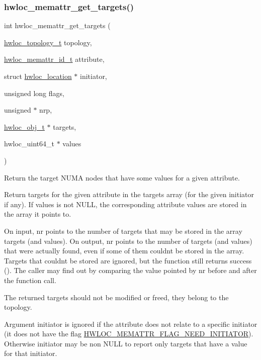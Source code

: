 \subsubsection{\texorpdfstring{hwloc\+\_\+memattr\+\_\+get\+\_\+targets()}{hwloc\_memattr\_get\_targets()}}
{\footnotesize\ttfamily int hwloc\+\_\+memattr\+\_\+get\+\_\+targets (\begin{DoxyParamCaption}\item[{\hyperlink{a00186_ga9d1e76ee15a7dee158b786c30b6a6e38}{hwloc\+\_\+topology\+\_\+t}}]{topology,  }\item[{\hyperlink{a00211_gacc82003a8610be554615995f0996c888}{hwloc\+\_\+memattr\+\_\+id\+\_\+t}}]{attribute,  }\item[{struct \hyperlink{a00314}{hwloc\+\_\+location} $\ast$}]{initiator,  }\item[{unsigned long}]{flags,  }\item[{unsigned $\ast$}]{nrp,  }\item[{\hyperlink{a00185_ga79b8ab56877ef99ac59b833203391c7d}{hwloc\+\_\+obj\+\_\+t} $\ast$}]{targets,  }\item[{hwloc\+\_\+uint64\+\_\+t $\ast$}]{values }\end{DoxyParamCaption})}



Return the target N\+U\+MA nodes that have some values for a given attribute. 

Return targets for the given attribute in the {\ttfamily targets} array (for the given initiator if any). If {\ttfamily values} is not {\ttfamily N\+U\+LL}, the corresponding attribute values are stored in the array it points to.

On input, {\ttfamily nr} points to the number of targets that may be stored in the array {\ttfamily targets} (and {\ttfamily values}). On output, {\ttfamily nr} points to the number of targets (and values) that were actually found, even if some of them couldn\textquotesingle{}t be stored in the array. Targets that couldn\textquotesingle{}t be stored are ignored, but the function still returns success ({}). The caller may find out by comparing the value pointed by {\ttfamily nr} before and after the function call.

The returned targets should not be modified or freed, they belong to the topology.

Argument {\ttfamily initiator} is ignored if the attribute does not relate to a specific initiator (it does not have the flag \hyperlink{a00212_gga78aceb4cac4d614c0f5e82dbfeb779e5a9d16523e285b2e22cfc78cc84dce8c96}{H\+W\+L\+O\+C\+\_\+\+M\+E\+M\+A\+T\+T\+R\+\_\+\+F\+L\+A\+G\+\_\+\+N\+E\+E\+D\+\_\+\+I\+N\+I\+T\+I\+A\+T\+OR}). Otherwise {\ttfamily initiator} may be non {\ttfamily N\+U\+LL} to report only targets that have a value for that initiator.

